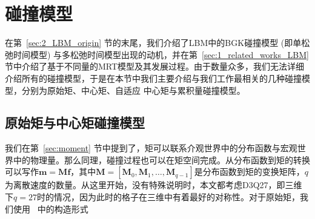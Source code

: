 \section{碰撞模型}
\label{sec:bg_collision}
在第~\ref{sec:2_LBM_origin} 节的末尾，我们介绍了LBM中的BGK碰撞模型 (即单松弛时间模型) 与多松弛时间模型出现的动机，并在第~\ref{sec:1_related_works_LBM} 节中介绍了基于不同量的MRT模型及其发展过程。由于数量众多，我们无法详细介绍所有的碰撞模型，于是在本节中我们主要介绍与我们工作最相关的几种碰撞模型，分别为原始矩、中心矩、自适应
中心矩与累积量碰撞模型。

\subsection{原始矩与中心矩碰撞模型}
\label{sec:background_mrt}
我们在第~\ref{sec:moment} 节中提到了，矩可以联系介观世界中的分布函数与宏观世界中的物理量。那么同理，碰撞过程也可以在矩空间完成。从分布函数到矩的转换可以写作$\mathbf{m}=\mathbf{M}\mathbf{f}$，其中$\mathbf{M}=[\mathbf{M}_0, \mathbf{M}_1, \dots, \mathbf{M}_{q-1}]$是分布函数到矩的变换矩阵，$q$为离散速度的数量。从这里开始，没有特殊说明时，本文都考虑D3Q27，即三维下$q=27$时的情况，因为此时的格子在三维中有着最好的对称性。对于原始矩，我们使用~\citep{PhysRevE.95.013310} 中的构造形式
